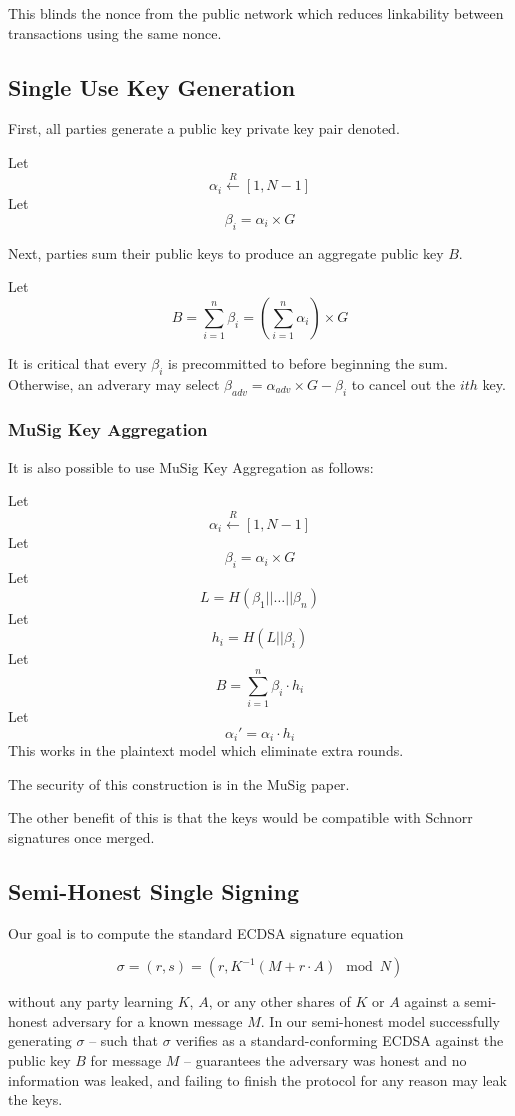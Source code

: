 \documentclass{article}
\begin{document}
This blinds the nonce from the public network which reduces linkability between transactions using the same nonce.


\subsection{Single Use Key Generation}

First, all parties generate a public key private key pair denoted.

Let $$\alpha_i \xleftarrow{R} [1, N-1]$$
Let $$\beta_i = \alpha_i \times G$$

Next, parties sum their public keys to produce an aggregate public key $B$.

Let $$ B = \sum\limits_{i = 1}^n \beta_i = \left(\sum\limits_{i=1}^n \alpha_i\right) \times G$$

It is critical that every $\beta_i$ is precommitted to before beginning the sum. Otherwise, an adverary may select $\beta_{adv} = \alpha_{adv}\times G - \beta_i$ to cancel out the $ith$ key.

\subsubsection{MuSig Key Aggregation}

It is also possible to use MuSig Key Aggregation as follows:

Let $$\alpha_i \xleftarrow{R} [1, N-1]$$
Let $$\beta_i = \alpha_i \times G$$
Let $$L = H(\beta_1 ||\ldots || \beta_n)$$
Let $$h_i = H(L || \beta_i)$$
Let $$ B = \sum\limits_{i = 1}^n \beta_i\cdot h_i$$
Let $$\alpha_i' = \alpha_i \cdot h_i$$
This works in the plaintext model which eliminate extra rounds.

The security of this construction is in the MuSig paper.

The other benefit of this is that the keys would be compatible with Schnorr signatures once merged.

\subsection{Semi-Honest Single Signing}

Our goal is to compute the standard ECDSA signature equation

$$\sigma = (r,s) = (r, K^{-1} ( M + r\cdot A) \mod N) $$

without any party learning $K$, $A$, or any other shares of $K$ or $A$ against a semi-honest adversary for a known message $M$. In our semi-honest model successfully generating $\sigma$ -- such that $\sigma$ verifies as a standard-conforming ECDSA against the public key $B$ for message $M$ -- guarantees the adversary was honest and no information was leaked, and failing to finish the protocol for any reason may leak the keys. 
\end{document}
